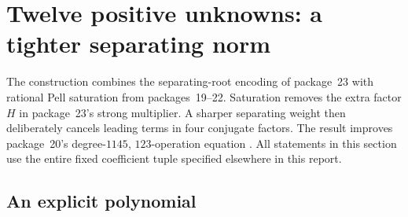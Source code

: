 \section{Twelve positive unknowns: a tighter separating norm}
\label{sec:positive}

The construction combines the separating-root encoding of package~23 with
rational Pell saturation from packages~19--22. Saturation removes the extra
factor $H$ in package~23's strong multiplier. A sharper separating weight
then deliberately cancels leading terms in four conjugate factors. The
result improves package~20's degree-$1145$, $123$-operation equation
\cite{repo19,repo20,repo21,repo23}. All statements in this section use the
entire fixed coefficient tuple specified elsewhere in this report.

\subsection{An explicit polynomial}

